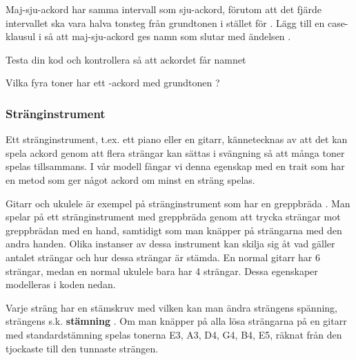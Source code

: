 {

\Task

\Subtask Maj-sju-ackord har samma intervall som sju-ackord, förutom att det fjärde intervallet ska vara  halva tonsteg från grundtonen i stället för . Lägg till en case-klausul i  så att maj-sju-ackord ges namn som slutar med ändelsen .

\Subtask Testa din kod och kontrollera så att ackordet  får namnet 


\Subtask Vilka fyra toner har ett -ackord med grundtonen ?

\subsubsection{Stränginstrument}

Ett stränginstrument, t.ex. ett piano eller en gitarr, kännetecknas av att det kan spela ackord genom att flera strängar kan sättas i svängning så att många toner spelas tillsammans. I vår modell fångar vi denna egenskap med en trait  som har en metod  som ger något ackord om minst en sträng spelas.

Gitarr och ukulele är exempel på stränginstrument som har en greppbräda . Man spelar på ett stränginstrument med greppbräda  genom att trycka strängar mot greppbrädan med en hand, samtidigt som man knäpper på strängarna med den andra handen. Olika instanser av dessa  instrument kan skilja sig åt vad gäller antalet strängar och hur dessa strängar är stämda. En normal gitarr har 6 strängar, medan en normal ukulele bara har 4 strängar. Dessa egenskaper modelleras i koden nedan.

Varje sträng har en stämskruv med vilken kan man ändra strängens spänning,  strängens s.k. \textbf{stämning} .  Om man knäpper på alla lösa strängarna på en gitarr med standardstämning spelas tonerna E3, A3, D4, G4, B4, E5, räknat från den tjockaste till den tunnaste strängen.


}
